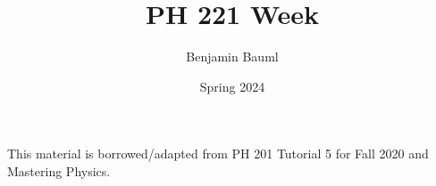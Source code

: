 \documentclass[]{article}
\title{PH 221 Week \Week}
\author{Benjamin Bauml}
\date{Spring 2024}
\newcommand{\FileDepth}{../../..}
\begin{document}
\maketitle
\begin{center}
	This material is borrowed/adapted from PH 201 Tutorial 5 for Fall 2020 and Mastering Physics.
\end{center}






\end{document}
